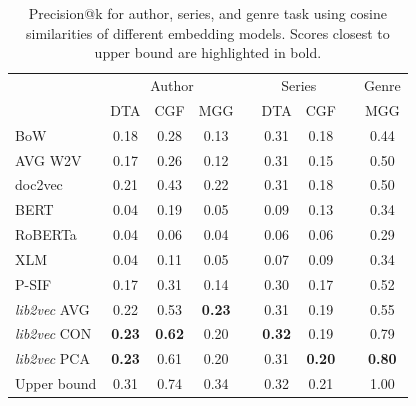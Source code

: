 \documentclass[11pt]{article}
\begin{document}
\begin{table}
	\centering
	\tabcolsep=1.3pt
	\begin{tabular}{lcccccccc}
		\toprule
		                             &        \multicolumn{3}{c}{Author}        &  & \multicolumn{2}{c}{Series} & & Genre\\ \cmidrule{2-4}\cmidrule{6-7}\cmidrule{9-9}
		                             &      DTA      &   CGF    	 &     MGG       &   &     DTA       &   CGF   & &   MGG    \\ \midrule
		BoW                          &     0.18   	 &   0.28   	 &     0.13      &   &     0.31      &  0.18      	 & &   0.44 \\
		AVG W2V                      &     0.17      &   0.26   	 &     0.12      &   &     0.31      &  0.15      	 & &   0.50 \\
		doc2vec                      &     0.21      &   0.43   	 &     0.22      &   &     0.31      &  0.18      	 & &   0.50 \\
		BERT                         &     0.04      &   0.19   	 &     0.05      &   &     0.09      &  0.13      	 & &   0.34 \\
		RoBERTa                      &     0.04      &   0.06    	 &     0.04      &   &     0.06      &  0.06      	 & &   0.29 \\
		XLM                          &     0.04      &   0.11    	 &     0.05      &   &     0.07      &  0.09      	 & &   0.34 \\
		P-SIF                        &     0.17      &   0.31    	 &     0.14      &   &     0.30      &  0.17      	 & &   0.52 \\
		\emph{lib2vec} AVG           &     0.22      &   0.53    	 & \textbf{0.23} &   &     0.31      &  0.19      	 & &   0.55 \\
		\emph{lib2vec} CON           & \textbf{0.23} & \textbf{0.62} &     0.20      &   & \textbf{0.32} &  0.19	  	 & &   0.79 \\
		\emph{lib2vec} PCA           & \textbf{0.23} & 	 0.61        &     0.20      &   & 	   0.31 	 & \textbf{0.20} & &   \textbf{0.80} \\
		Upper bound                  &     0.31      &   0.74        &     0.34      &   &     0.32      &  0.21      	 & &   1.00 \\ \bottomrule
	\end{tabular}
	\caption{Precision@k for author, series, and genre task using cosine similarities of different embedding models. Scores closest to upper bound are highlighted in bold.}
	\label{tab:sim}
\end{table}
\end{document}
